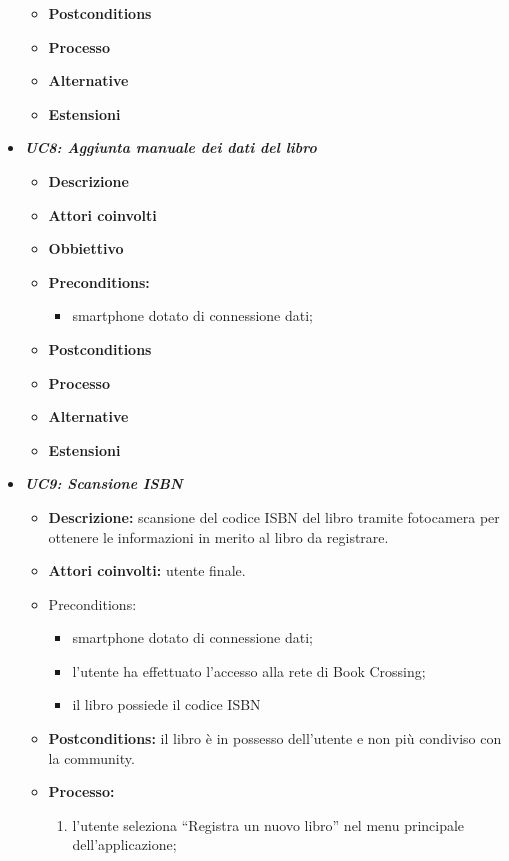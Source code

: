 \begin{itemize}
\begin{itemize}
\begin{itemize}
		\end{itemize}
		\item \textbf{Postconditions}
		\item \textbf{Processo}
		\item \textbf{Alternative}
		\item \textbf{Estensioni}
	\end{itemize}
	\item \textbf{\textit{UC8: Aggiunta manuale dei dati del libro}}
	\begin{itemize}
		\item \textbf{Descrizione}
		\item \textbf{Attori coinvolti}
		\item \textbf{Obbiettivo}
		\item \textbf{Preconditions:}
		\begin{itemize}
			\item smartphone dotato di connessione dati;
		\end{itemize}
		\item \textbf{Postconditions}
		\item \textbf{Processo}
		\item \textbf{Alternative}
		\item \textbf{Estensioni}
	\end{itemize}
	\item \textbf{\textit{UC9: Scansione ISBN}}
	\begin{itemize}
		\item \textbf{Descrizione:} scansione del codice ISBN del libro tramite fotocamera per ottenere le informazioni in merito al libro da registrare.
		\item \textbf{Attori coinvolti:} utente finale.
		\item {Preconditions:} 
		\begin{itemize}
			\item smartphone dotato di connessione dati;
			\item l’utente ha effettuato l’accesso alla rete di Book Crossing;
			\item il libro possiede il codice ISBN
		\end{itemize}
		\item \textbf{Postconditions:} il libro è in possesso dell'utente e non più condiviso con la community.
		\item \textbf{Processo:}
		\begin{enumerate}
			\item l’utente seleziona “Registra un nuovo libro” nel menu principale dell’applicazione;

\end{enumerate}
\end{itemize}
\end{itemize}
